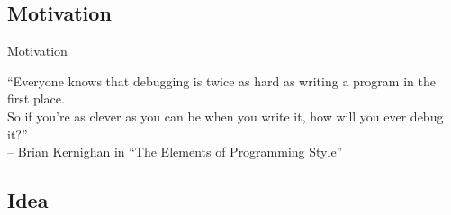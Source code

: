 \subsection{Motivation}
\begin{frame}{Motivation}
	\begin{center}
		\enquote{Everyone knows that debugging is twice as hard as writing a program in the first place. \\[1.5em] So if you're as clever as you can be when you write it, how will you ever debug it?} \\[3em]
		-- Brian Kernighan in ``The Elements of Programming Style''
	\end{center}
\end{frame}


\subsection{Idea}

